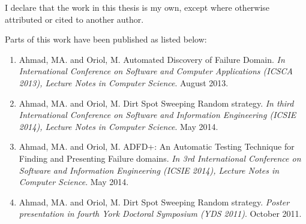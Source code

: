 \begin{declaration}

I declare that the work in this thesis is my own, except where otherwise attributed or cited to another author. 

Parts of this work have been published as listed below: 

\begin{enumerate}

\item Ahmad, MA. and Oriol, M. Automated Discovery of Failure Domain. \textit{In International Conference on Software and Computer Applications (ICSCA 2013), Lecture Notes in Computer Science}. August 2013.

\item Ahmad, MA. and Oriol, M. Dirt Spot Sweeping Random strategy. \textit{In third International Conference on Software and Information Engineering (ICSIE 2014), Lecture Notes in Computer Science}. May 2014.

\item Ahmad, MA. and Oriol, M. ADFD+: An Automatic Testing Technique for Finding and Presenting Failure domains. \textit{In 3rd International Conference on Software and Information Engineering (ICSIE 2014), Lecture Notes in Computer Science}. May 2014.

\item Ahmad, MA. and Oriol, M. Dirt Spot Sweeping Random strategy. \textit{Poster presentation in fourth York Doctoral Symposium (YDS 2011)}. October 2011.

\end{enumerate}



\end{declaration}